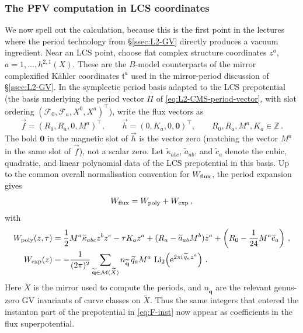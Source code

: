 \subsubsection*{The PFV computation in LCS coordinates}

We now spell out the calculation, because this is the first point in
the lectures where the period technology from \S\ref{ssec:L2-GV}
directly produces a vacuum ingredient.
Near an LCS point, choose flat
complex structure coordinates $z^a$, $a=1,\ldots,h^{2,1}(X)$.
These are the $B$-model counterparts of the mirror
complexified K\"ahler coordinates $\mathfrak t^a$ used in the
mirror-period discussion of \S\ref{ssec:L2-GV}.  In the symplectic
period basis adapted to the LCS prepotential (the basis
underlying the period vector $\Pi$ of
\eqref{eq:L2-CMS-period-vector}, with slot ordering
$(\mathcal F_0, \mathcal F_a, X^0, X^a)^{\top}$),
write the flux vectors as
\begin{equation}\label{eq:L2-PFV-flux-ansatz}
    \vec f=(R_0,R_a,0,M^a)^{\top},
    \qquad
    \vec h=(0,K_a,0,\mathbf 0)^{\top},
    \qquad
    R_0,R_a,M^a,K_a\in\mathbb Z\, .
\end{equation}
The bold $\mathbf 0$ in the magnetic slot of $\vec h$ is the
vector zero (matching the vector $M^a$ in the same slot of $\vec
f$), not a scalar zero.
Let $\widetilde\kappa_{abc}$, $\widetilde a_{ab}$, and
$\widetilde c_a$ denote the cubic, quadratic, and linear
polynomial data of the LCS prepotential in this basis.  Up to the
common overall normalisation convention for $W_{\rm flux}$, the
period expansion gives
\begin{equation}\label{eq:L2-PFV-W-split}
    W_{\rm flux}=W_{\rm poly}+W_{\rm exp}\, ,
\end{equation}
with
\begin{align}
    W_{\rm poly}(z,\tau)
    &=
      \frac12 M^a\widetilde\kappa_{abc}z^bz^c
      -\tau K_a z^a
      +(R_a-\widetilde a_{ab}M^b)z^a
      +\left(R_0-\frac{1}{24}M^a\widetilde c_a\right)\, ,
      \label{eq:L2-PFV-Wpoly}\\
    W_{\rm exp}(z)
    &=
      -\frac{1}{(2\pi)^2}
      \sum_{\widetilde{\mathbf q}\in\mathcal{M}(\widetilde X)}
      n_{\widetilde{\mathbf q}}\,
      \widetilde q_a M^a\,
      \operatorname{Li}_2
      \!\left(
        \mathrm{e}^{2\pi\mathrm{i}\,\widetilde q_a z^a}
      \right)\, .
      \label{eq:L2-PFV-Wexp}
\end{align}
Here $\widetilde X$ is the mirror used to compute the periods, and
$n_{\widetilde{\mathbf q}}$ are the relevant genus-zero GV
invariants of curve classes on $\widetilde X$.  Thus the same
integers that entered the instanton part of the prepotential in
\eqref{eq:F-inst} now appear as coefficients in the flux
superpotential.


